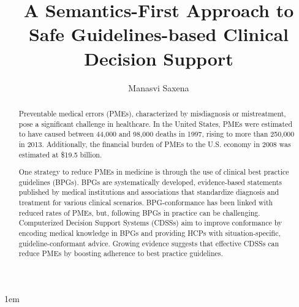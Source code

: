 \documentclass[edeposit,tocnosub,noragright,centerchapter,fullpagesingle,12pt]{uiuc_csthesis21}
\title{A Semantics-First Approach to Safe Guidelines-based Clinical Decision Support}
\author{Manasvi Saxena}
\theoremstyle{definition}
\numberwithin{algocf}{chapter}     %
\begin{document}
%

%
\maketitle

\parindent 1em%

\frontmatter

%
\begin{abstract}
  Preventable medical errors (PMEs), characterized by misdiagnosis or mistreatment,
  pose a significant challenge in healthcare.
  In the United States, PMEs were estimated to have caused between
  44,000 and 98,000 deaths in 1997,
  rising to more than 250,000 in 2013. Additionally, the
  financial burden of PMEs to the U.S. economy in 2008 was estimated at \$19.5 billion.

  One strategy to reduce PMEs in medicine is through the use of
  clinical best practice guidelines (BPGs). BPGs are systematically developed,
  evidence-based statements published by medical institutions and associations
  that standardize diagnosis and treatment for various clinical scenarios.
  BPG-conformance has been linked with reduced rates of PMEs, but,
  following BPGs in practice can be challenging.
  Computerized Decision Support Systems (CDSSs) aim to improve conformance
  by encoding medical knowledge in BPGs and providing HCPs with
  situation-specific, guideline-conformant advice.
  Growing evidence suggests that
  effective CDSSs can reduce PMEs by boosting adherence to best practice guidelines.


\end{abstract}
\end{document}
